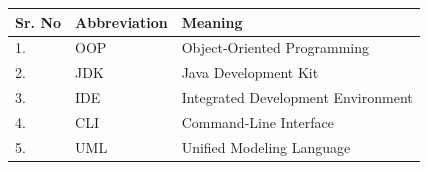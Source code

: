 {}

\noindent
\renewcommand{\arraystretch}{1.3}
\begin{tabularx}{\textwidth}{|p{}|p{}|X|}
\hline
\textbf{Sr. No} & \textbf{Abbreviation} & \textbf{Meaning}\\
\hline
1. & OOP & Object-Oriented Programming\\
\hline
2. & JDK & Java Development Kit\\
\hline
3. & IDE & Integrated Development Environment\\
\hline
4. & CLI & Command-Line Interface\\
\hline
5. & UML & Unified Modeling Language\\
\hline
\end{tabularx}
\clearpage
